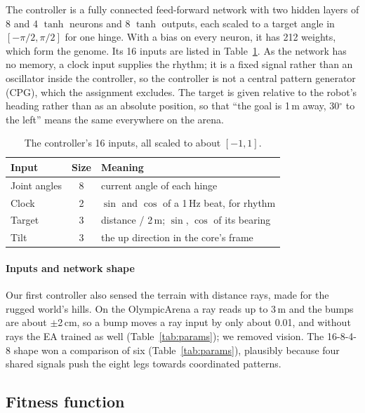 \documentclass[sigconf]{acmart}
\begin{document}
The controller is a fully connected feed-forward network with two hidden layers
of 8 and 4 $\tanh$ neurons and 8 $\tanh$ outputs, each scaled to a
target angle in $[-\pi/2, \pi/2]$ for one hinge. With a bias on every neuron, it
has 212 weights, which form the genome. Its 16 inputs are listed in
Table~\ref{tab:inputs}. As the network has no memory, a clock input
supplies the rhythm; it is a fixed signal rather than an oscillator inside the
controller, so the controller is not a central pattern generator (CPG), which
the assignment excludes. The target is given relative to the robot's
heading rather than as an absolute position, so that ``the goal is 1\,m away,
30$^\circ$ to the left'' means the same everywhere on the arena.

\begin{table}[t]
  \caption{The controller's 16 inputs, all scaled to about $[-1, 1]$.}
  \label{tab:inputs}
  \small
  \begin{tabular}{lcl}
    \toprule
    Input & Size & Meaning \\
    \midrule
    Joint angles & 8 & current angle of each hinge \\
    Clock & 2 & $\sin$ and $\cos$ of a 1\,Hz beat, for rhythm \\
    Target & 3 & distance / 2\,m; $\sin$, $\cos$ of its bearing \\
    Tilt & 3 & the up direction in the core's frame \\
    \bottomrule
  \end{tabular}
\end{table}

\paragraph{Inputs and network shape} Our first controller also sensed the
terrain with distance rays, made for the rugged world's hills. On the
OlympicArena a ray reads up to 3\,m and the bumps are about $\pm$2\,cm,
so a bump moves a ray input by only about 0.01, and without rays the EA
trained as well (Table~\ref{tab:params}); we removed vision. The 16-8-4-8
shape won a comparison of six (Table~\ref{tab:params}), plausibly because four
shared signals push the eight legs towards coordinated patterns.


\subsection{Fitness function}
\label{sec:fitness}
\end{document}
